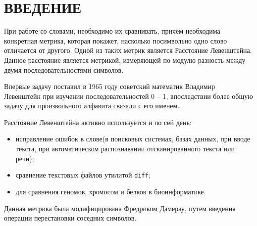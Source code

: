 \chapter*{\hfill{\centering  ВВЕДЕНИЕ}\hfill}


При работе со словами, необходимо их сравнивать, причем необходима конкретная метрика, которая покажет, насколько посимвольно одно слово отличается от другого.
Одной из таких метрик является Расстояние Левенштейна.
Данное расстояние является метрикой, измеряющей по модулю разность между двумя последовательностями символов. \cite{levenshtein}

Впервые задачу поставил в 1965 году советский математик Владимир Левенштейн при изучении последовательностей 0 -- 1, впоследствии более общую задачу для произвольного алфавита связали с его именем.

Расстояние Левенштейна активно используется и по сей день:
\begin{itemize}[label=---]
	\item исправление ошибок в слове(в поисковых системах, базах данных, при вводе текста, при автоматическом распознавании отсканированного текста или речи);
	\item сравнение текстовых файлов утилитой \texttt{diff};
	\item для сравнения геномов, хромосом и белков в биоинформатике.
\end{itemize}

Данная метрика была модифицирована Фредриком Дамерау, путем введения операции перестановки соседних символов. \cite{Damerau}


